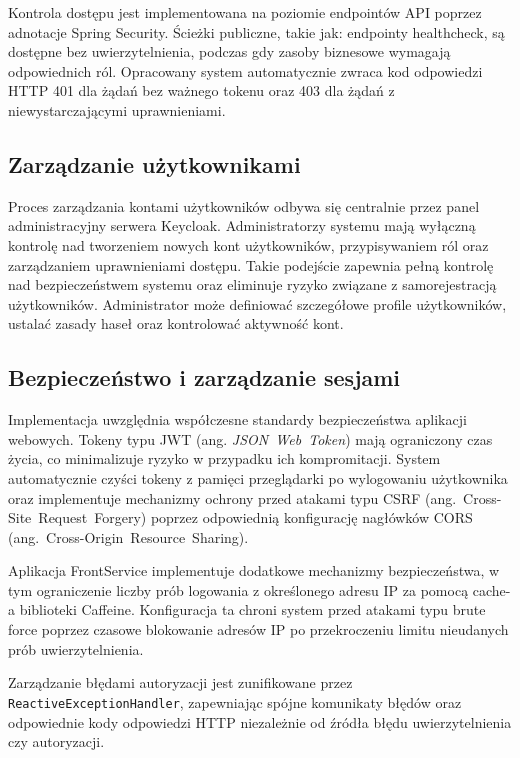 Kontrola dostępu jest implementowana na poziomie endpointów API poprzez adnotacje Spring Security. Ścieżki publiczne, takie jak: endpointy healthcheck, są dostępne bez uwierzytelnienia, podczas gdy zasoby biznesowe wymagają odpowiednich ról. Opracowany system automatycznie zwraca kod odpowiedzi HTTP 401 dla żądań bez ważnego tokenu oraz 403 dla żądań z niewystarczającymi uprawnieniami.

\subsection{Zarządzanie użytkownikami}

Proces zarządzania kontami użytkowników odbywa się centralnie przez panel administracyjny serwera Keycloak. Administratorzy systemu mają wyłączną kontrolę nad tworzeniem nowych kont użytkowników, przypisywaniem ról oraz zarządzaniem uprawnieniami dostępu. Takie podejście zapewnia pełną kontrolę nad bezpieczeństwem systemu oraz eliminuje ryzyko związane z samorejestracją użytkowników. Administrator może definiować szczegółowe profile użytkowników, ustalać zasady haseł oraz kontrolować aktywność kont. 

\subsection{Bezpieczeństwo i zarządzanie sesjami}

Implementacja uwzględnia współczesne standardy bezpieczeństwa aplikacji webowych. Tokeny typu JWT (ang. \textit{\mbox{JSON Web Token}}) mają ograniczony czas życia, co minimalizuje ryzyko w przypadku ich kompromitacji. System automatycznie czyści tokeny z pamięci przeglądarki po wylogowaniu użytkownika oraz implementuje mechanizmy ochrony przed atakami typu CSRF (ang.~\mbox{Cross-Site Request Forgery}) poprzez odpowiednią konfigurację nagłówków CORS \\ (ang.~\mbox{Cross-Origin Resource Sharing}).

Aplikacja FrontService implementuje dodatkowe mechanizmy bezpieczeństwa, w tym ograniczenie liczby prób logowania z określonego adresu IP za pomocą cache-a biblioteki Caffeine. Konfiguracja ta chroni system przed atakami typu brute force poprzez czasowe blokowanie adresów IP po przekroczeniu limitu nieudanych prób uwierzytelnienia.

Zarządzanie błędami autoryzacji jest zunifikowane przez \texttt{ReactiveExceptionHandler}, zapewniając spójne komunikaty błędów oraz odpowiednie kody odpowiedzi HTTP niezależnie od źródła błędu uwierzytelnienia czy autoryzacji.